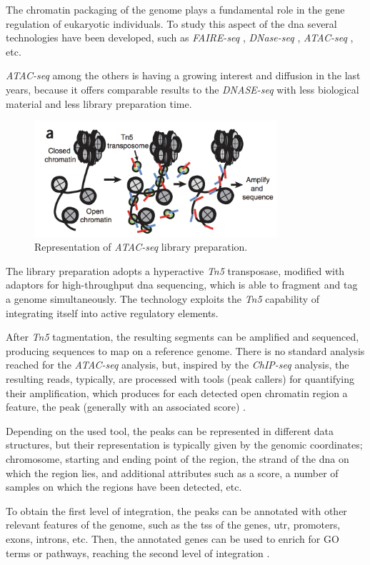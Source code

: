 The chromatin packaging of the genome plays a fundamental role in the gene regulation of eukaryotic individuals.
To study this aspect of the \gls{dna} several technologies have been developed, such as \textit{FAIRE-seq} \cite{Giresi2007}, \textit{DNase-seq} \cite{Winter2013}, \textit{ATAC-seq} \cite{Buenrostro2013}, etc.

\textit{ATAC-seq} among the others is having a growing interest and diffusion in the last years, because it offers comparable results to the \textit{DNASE-seq} with less biological material and less library preparation time.

\begin{figure}[h]
\centering
\includegraphics[width=9cm,keepaspectratio]{img/intro/atac.png}
\caption[ATAC-seq experiment]{Representation of \textit{ATAC-seq }library preparation. \cite{Buenrostro2013}}
\label{fig:atacseqexp}
\end{figure}

The library preparation adopts a hyperactive \textit{Tn5} transposase, modified with adaptors for high-throughput  \gls{dna} sequencing, which is able to fragment and tag a genome simultaneously.
The technology exploits the \textit{Tn5} capability of integrating itself into active regulatory elements.

After \textit{Tn5} tagmentation, the resulting segments can be amplified and sequenced, producing sequences to map on a reference genome.
There is no standard analysis reached for the \textit{ATAC-seq} analysis, but, inspired by the \textit{ChIP-seq} analysis, the resulting reads, typically, are processed with tools (peak callers) for quantifying their amplification, which produces for each detected open chromatin region a feature, the peak (generally with an associated score) \cite{Wei2018}. 

Depending on the used tool, the peaks can be represented in different data structures, but their representation is typically given by the genomic coordinates; chromosome, starting and ending point of the region, the strand of the \gls{dna} on which the region lies, and additional attributes such as a score, a number of samples on which the regions have been detected, etc.

To obtain the first level of integration, the peaks can be annotated with other relevant features of the genome, such as the \gls{tss} of the genes, \gls{utr}, promoters, exons, introns, etc.  
Then, the annotated genes can be used to enrich for GO terms or pathways, reaching the second level of integration \cite{righelli2018, Koberstein2018, Ou2018}.




